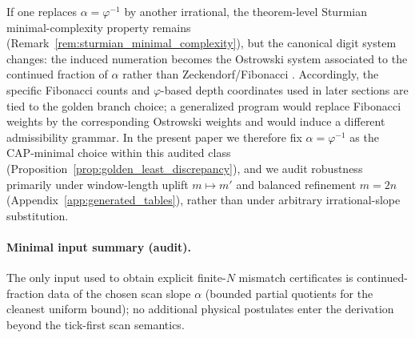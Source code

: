 \begin{remark}\label{rem:alpha_variation}
If one replaces $\alpha=\varphi^{-1}$ by another irrational, the theorem-level Sturmian minimal-complexity property remains (Remark~\ref{rem:sturmian_minimal_complexity}), but the canonical digit system changes: the induced numeration becomes the Ostrowski system associated to the continued fraction of $\alpha$ rather than Zeckendorf/Fibonacci \cite{AlloucheShallit2003,Lothaire2002}.
Accordingly, the specific Fibonacci counts and $\varphi$-based depth coordinates used in later sections are tied to the golden branch choice; a generalized program would replace Fibonacci weights by the corresponding Ostrowski weights and would induce a different admissibility grammar.
In the present paper we therefore fix $\alpha=\varphi^{-1}$ as the CAP-minimal choice within this audited class (Proposition~\ref{prop:golden_least_discrepancy}), and we audit robustness primarily under window-length uplift $m\mapsto m'$ and balanced refinement $m=2n$ (Appendix~\ref{app:generated_tables}), rather than under arbitrary irrational-slope substitution.
\end{remark}

\paragraph{Minimal input summary (audit).}
\AuditTag The only input used to obtain explicit finite-$N$ mismatch certificates is continued-fraction data of the chosen scan slope $\alpha$ (bounded partial quotients for the cleanest uniform bound); no additional physical postulates enter the derivation beyond the tick-first scan semantics.


